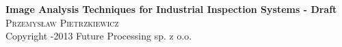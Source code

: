 \newcommand{\coverPage}[3]
{
	\begin{titlingpage}
	\begin{center}







	{ \huge \bfseries #2}\\[0.4cm]

	\textsc{\Large #1}\\[0.5cm]
	\null
	\vfill
	{\small #3}
	\end{center}
	\end{titlingpage}



	\thispagestyle{empty}	
	\newpage
}


\coverPage
{Przemys\l aw Pietrzkiewicz}
{Image Analysis Techniques for Industrial Inspection Systems - Draft}
{Copyright \textcopyright 2012-2013 Future Processing sp. z o.o.}
